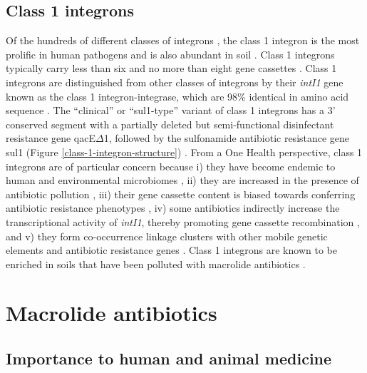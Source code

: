 \subsection{Class 1 integrons}

Of the hundreds of different classes of integrons \parencite{Abella.2015}, the class 1 integron is the most prolific in human pathogens and is also abundant in soil \parencite{Dawes.2010, RuizMartinez.2011, Gillings.2018}.
Class 1 integrons typically carry less than six and no more than eight gene cassettes \parencite{Gillings.2014, Naas.2001}.
Class 1 integrons are distinguished from other classes of integrons by their \textit{intI1} gene known as the class 1 integron-integrase, which are 98\% identical in amino acid sequence \parencite{Roy.2021}.
The “clinical” or “sul1-type” variant of class 1 integrons has a 3’ conserved segment with a partially deleted but semi-functional disinfectant resistance gene qacE${\Delta}$1, followed by the sulfonamide antibiotic resistance gene sul1 (Figure \ref{class-1-integron-structure}) \parencite{Partridge.2018}.
From a One Health perspective, class 1 integrons are of particular concern because i) they have become endemic to human and environmental microbiomes \parencite{Gillings.2017}, ii) they are increased in the presence of antibiotic pollution \parencite{Gillings.2017, Wright.2008, Stalder.2014}, iii) their gene cassette content is biased towards conferring antibiotic resistance phenotypes \parencite{Yang.2021}, iv) some antibiotics indirectly increase the transcriptional activity of \textit{intI1}, thereby promoting gene cassette recombination \parencite{Baharoglu.2010}, and v) they form co-occurrence linkage clusters with other mobile genetic elements and antibiotic resistance genes \parencite{Pal.2015}.
Class 1 integrons are known to be enriched in soils that have been polluted with macrolide antibiotics \parencite{Lau.2020}.

\section{Macrolide antibiotics}

\subsection{Importance to human and animal medicine}

